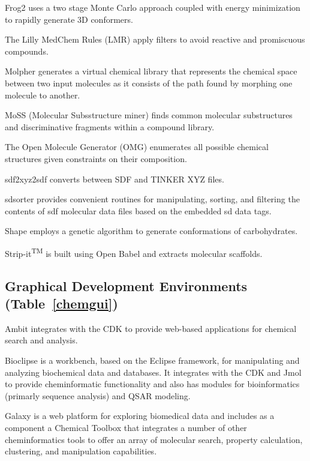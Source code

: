 Frog2 \cite{Miteva_2010} uses a two stage Monte Carlo approach coupled with energy minimization to rapidly generate 3D conformers.

The Lilly MedChem Rules (LMR)  \cite{Bruns_2012} apply filters to avoid reactive and promiscuous compounds.

Molpher  \cite{Hoksza_2014} generates a virtual chemical library that represents the chemical space between two input molecules as it consists of the path found by morphing one molecule to another.

MoSS (Molecular Subsstructure miner) \cite{Borgelt_2005} finds common molecular substructures and discriminative fragments within a compound library.

The Open Molecule Generator (OMG) \cite{Peironcely_2012} enumerates all possible chemical structures given constraints on their composition.

sdf2xyz2sdf  \cite{Tosco_2011} converts between SDF and TINKER XYZ files.

sdsorter provides convenient routines for manipulating, sorting, and filtering the contents of sdf molecular data files based on the embedded sd data tags.

Shape \cite{Rosen_2009} employs a genetic algorithm to generate conformations of carbohydrates.

Strip-it\textsuperscript{TM} is built using Open Babel and extracts molecular scaffolds. 


\subsection*{Graphical Development Environments (Table~\ref{chemgui})} 

Ambit \cite{Jeliazkova_2011} integrates with the CDK to provide web-based applications for chemical search and analysis.

Bioclipse  \cite{Spjuth_2009} is a workbench, based on the Eclipse framework, for manipulating and analyzing biochemical data and databases. It integrates with the CDK and Jmol to provide cheminformatic functionality and also has modules for bioinformatics (primarly sequence analysis) and QSAR modeling.

Galaxy \cite{Goecks_2010} is a web platform for exploring biomedical data and includes as a component a Chemical Toolbox that integrates a number of other cheminformatics tools to offer an array of molecular search, property calculation, clustering, and manipulation capabilities.

